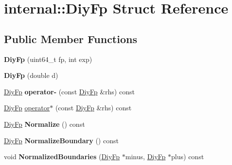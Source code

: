 \hypertarget{structinternal_1_1DiyFp}{}\section{internal\+:\+:Diy\+Fp Struct Reference}
\label{structinternal_1_1DiyFp}
\subsection*{Public Member Functions}
\begin{DoxyCompactItemize}
\item 
\mbox{\label{structinternal_1_1DiyFp_a9a8f2f5c49dfa0dee4a527f0829cc2e5}} 
{\bfseries Diy\+Fp} (uint64\+\_\+t fp, int exp)
\item 
\mbox{\label{structinternal_1_1DiyFp_adc132c7da4c8e3ee5ae12efdcf6dbf7c}} 
{\bfseries Diy\+Fp} (double d)
\item 
\mbox{\label{structinternal_1_1DiyFp_a9cea201daabec04c6f2526b35af8ead3}} 
\hyperlink{structinternal_1_1DiyFp}{Diy\+Fp} {\bfseries operator-\/} (const \hyperlink{structinternal_1_1DiyFp}{Diy\+Fp} \&rhs) const
\item 
\hyperlink{structinternal_1_1DiyFp}{Diy\+Fp} \hyperlink{structinternal_1_1DiyFp_a9868841f824924cc385ad5163c9c85b3}{operator$\ast$} (const \hyperlink{structinternal_1_1DiyFp}{Diy\+Fp} \&rhs) const
\item 
\mbox{\label{structinternal_1_1DiyFp_aa6cbacc8dfcd92cb8c57884e45548976}} 
\hyperlink{structinternal_1_1DiyFp}{Diy\+Fp} {\bfseries Normalize} () const
\item 
\mbox{\label{structinternal_1_1DiyFp_a3a840e739b412e20e11c05a03f4573df}} 
\hyperlink{structinternal_1_1DiyFp}{Diy\+Fp} {\bfseries Normalize\+Boundary} () const
\item 
\mbox{\label{structinternal_1_1DiyFp_adef8bf723f24db9dc6cefa260e8c2390}} 
void {\bfseries Normalized\+Boundaries} (\hyperlink{structinternal_1_1DiyFp}{Diy\+Fp} $\ast$minus, \hyperlink{structinternal_1_1DiyFp}{Diy\+Fp} $\ast$plus) const
\item 
\mbox{\label{structinternal_1_1DiyFp_acf0e7974f0a1175ae04edf8e4a7d1319}} 

\end{DoxyCompactItemize}
